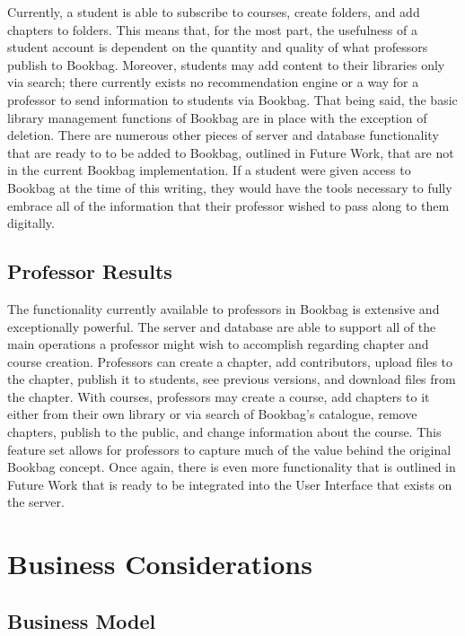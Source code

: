 \documentclass[pageno]{jpaper}
\begin{document}
Currently, a student is able to subscribe to courses, create folders, and add chapters to folders. This means that, for the most part, the usefulness of a student account is dependent on the quantity and quality of what professors publish to Bookbag. Moreover, students may add content to their libraries only via search; there currently exists no recommendation engine or a way for a professor to send information to students via Bookbag. That being said, the basic library management functions of Bookbag are in place with the exception of deletion. There are numerous other pieces of server and database functionality that are ready to to be added to Bookbag, outlined in Future Work, that are not in the current Bookbag implementation. If a student were given access to Bookbag at the time of this writing, they would have the tools necessary to fully embrace all of the information that their professor wished to pass along to them digitally.

\subsection{Professor Results}

The functionality currently available to professors in Bookbag is extensive and exceptionally powerful. The server and database are able to support all of the main operations a professor might wish to accomplish regarding chapter and course creation. Professors can create a chapter, add contributors, upload files to the chapter, publish it to students, see previous versions, and download files from the chapter. With courses, professors may create a course, add chapters to it either from their own library or via search of Bookbag's catalogue, remove chapters, publish to the public, and change information about the course. This feature set allows for professors to capture much of the value behind the original Bookbag concept. Once again, there is even more functionality that is outlined in Future Work that is ready to be integrated into the User Interface that exists on the server.

\section{Business Considerations} \label{model}

\subsection{Business Model}
\end{document}

